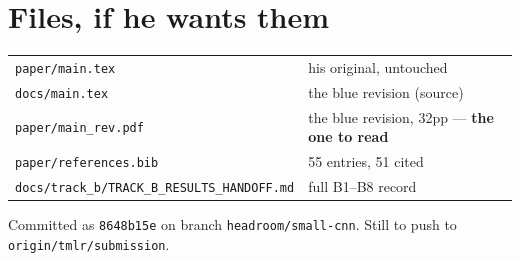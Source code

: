 \documentclass[11pt,a4paper]{article}
\begin{document}
\section{Files, if he wants them}

\begin{center}\small
\begin{tabular}{ll}
\toprule
\texttt{paper/main.tex} & his original, untouched \\
\texttt{docs/main.tex} & the blue revision (source) \\
\texttt{paper/main\_rev.pdf} & the blue revision, 32pp --- \textbf{the one to read} \\
\texttt{paper/references.bib} & 55 entries, 51 cited \\
\texttt{docs/track\_b/TRACK\_B\_RESULTS\_HANDOFF.md} & full B1--B8 record \\
\bottomrule
\end{tabular}
\end{center}

\vspace{6pt}
\noindent\small Committed as \texttt{8648b15e} on branch \texttt{headroom/small-cnn}.
Still to push to \texttt{origin/tmlr/submission}.
\end{document}

